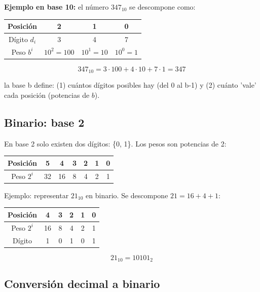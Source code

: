 \documentclass[10pt,a4paper]{article}
\theoremstyle{definition}
\begin{document}
\textbf{Ejemplo en base 10:} el número $347_{10}$ se descompone como:

\begin{center}
    \begin{tabular}{c|ccc}
    \toprule
    Posición & 2 & 1 & 0 \\
    \midrule
    Dígito $d_i$ & 3 & 4 & 7 \\
    Peso $b^i$ & $10^2 = 100$ & $10^1 = 10$ & $10^0 = 1$\\
    \bottomrule
    \end{tabular}
\end{center}

\[
347_{10} = 3 \cdot 100 + 4 \cdot 10 + 7 \cdot 1 = 347
\]

la base b define: (1) cuántos dígitos posibles hay (del 0 al b-1) 
y (2) cuánto 'vale' cada posición (potencias de $b$).

\subsection{Binario: base 2}

En base 2 solo existen dos dígitos: \{0, 1\}. Los pesos son potencias de 2:

\begin{center}
\begin{tabular}{c|cccccc}
    
    \toprule
    Posición & 5 & 4 & 3 & 2 & 1 & 0 \\
    \midrule
    Peso $2^i$ & 32 & 16 & 8 & 4 & 2 & 1 \\
    \bottomrule

\end{tabular}
\end{center}

Ejemplo: representar $21_{10}$ en binario.
Se descompone $21 = 16 + 4 + 1$:

\begin{center}
\begin{tabular}{c|ccccc}
    \toprule
    Posición & 4 & 3 & 2 & 1 & 0 \\
    \midrule
    Peso $2^i$ & 16 & 8 & 4 & 2 & 1\\
    Dígito & 1 & 0 & 1 & 0 & 1 \\
    \bottomrule
\end{tabular}
\end{center}

 \[
     21_{10} = 10101_{2}
 \]

\subsection{Conversión decimal a binario}
\end{document}
